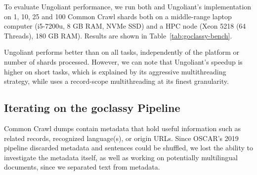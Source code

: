To evaluate Ungoliant performance, we run both \goclassy and Ungoliant's implementation on 1, 10, 25 and 100 Common Crawl shards both on a middle-range laptop computer (i5-7200u, 8 GB RAM, NVMe SSD) and a HPC node (Xeon 5218 (64 Threads), 180 GB RAM). Results are shown in Table~\ref{tab:goclassy-bench}.

\begin{table}[t]
    \centering\small
    \caption{Comparison of approximate generation times depending on platform and number of shards.}
    \label{tab:goclassy-bench}
\end{table}

Ungoliant performs better than \goclassy on all tasks, independently of the platform or number of shards processed. However, we can note that Ungoliant's speedup is higher on short tasks, which is explained by its aggressive multithreading strategy, while \goclassy uses a record-scope multithreading at its finest granularity.


\subsection{Iterating on the goclassy Pipeline}


Common Crawl dumps contain metadata that hold useful information such as related records, recognized language(s), or origin URLs. Since OSCAR's 2019 pipeline discarded metadata and sentences could be shuffled, we lost the ability to investigate the metadata itself, as well as working on potentially multilingual documents, since we separated text from metadata.


